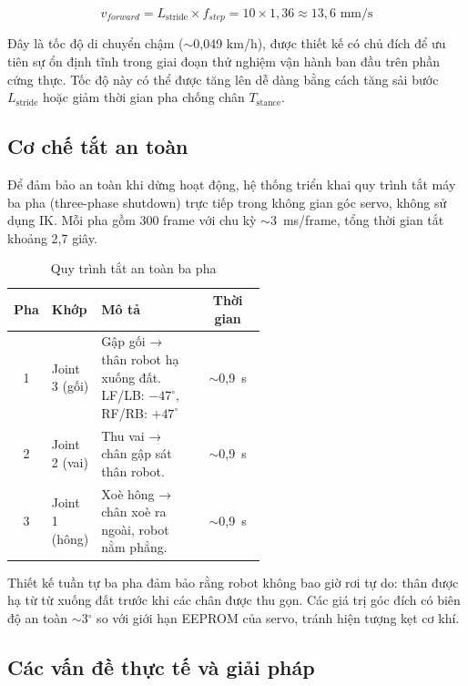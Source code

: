 \begin{equation}
    v_{forward} = L_{\text{stride}} \times f_{step} = 10 \times 1{,}36 \approx 13{,}6 \text{ mm/s}
\end{equation}

Đây là tốc độ di chuyển chậm ($\sim$0,049 km/h), được thiết kế có chủ đích để ưu tiên sự ổn định tĩnh trong giai đoạn thử nghiệm vận hành ban đầu trên phần cứng thực. Tốc độ này có thể được tăng lên dễ dàng bằng cách tăng sải bước $L_{\text{stride}}$ hoặc giảm thời gian pha chống chân $T_{\text{stance}}$.



\subsection{Cơ chế tắt an toàn}

Để đảm bảo an toàn khi dừng hoạt động, hệ thống triển khai quy trình tắt máy ba pha (three-phase shutdown) trực tiếp trong không gian góc servo, không sử dụng IK. Mỗi pha gồm 300 frame với chu kỳ $\sim$3~ms/frame, tổng thời gian tắt khoảng 2,7 giây.

\begin{table}[H]
\centering
\caption{Quy trình tắt an toàn ba pha}
\label{tab:robotoff}
\renewcommand{\arraystretch}{1.4}
\begin{tabular}{|c|p{0.15\linewidth}|p{0.40\linewidth}|c|}
\hline
\textbf{Pha} & \textbf{Khớp} & \textbf{Mô tả} & \textbf{Thời gian} \\ \hline
1 & Joint 3 (gối) & Gập gối → thân robot hạ xuống đất. LF/LB: $-47^\circ$, RF/RB: $+47^\circ$ & $\sim$0,9~s \\ \hline
2 & Joint 2 (vai) & Thu vai → chân gập sát thân robot. & $\sim$0,9~s \\ \hline
3 & Joint 1 (hông) & Xoè hông → chân xoè ra ngoài, robot nằm phẳng. & $\sim$0,9~s \\ \hline
\end{tabular}
\end{table}

Thiết kế tuần tự ba pha đảm bảo rằng robot không bao giờ rơi tự do: thân được hạ từ từ xuống đất trước khi các chân được thu gọn. Các giá trị góc đích có biên độ an toàn $\sim$3$^\circ$ so với giới hạn EEPROM của servo, tránh hiện tượng kẹt cơ khí.


\subsection{Các vấn đề thực tế và giải pháp}

